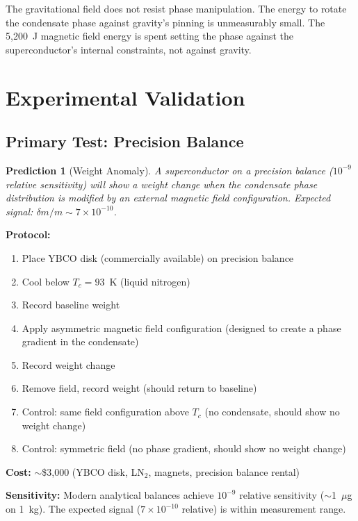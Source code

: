 \documentclass[11pt, a4paper]{article}
\newtheorem{prediction}{Prediction}[section]
\begin{document}
The gravitational field does not resist phase manipulation.
The energy to rotate the condensate phase against gravity's
pinning is unmeasurably small. The 5{,}200~J magnetic field
energy is spent setting the phase against the superconductor's
internal constraints, not against gravity.

\section{Experimental Validation}

\subsection{Primary Test: Precision Balance}

\begin{prediction}[Weight Anomaly]
A superconductor on a precision balance ($10^{-9}$ relative
sensitivity) will show a weight change when the condensate phase
distribution is modified by an external magnetic field
configuration. Expected signal: $\delta m/m \sim 7 \times 10^{-10}$.
\end{prediction}

\textbf{Protocol:}
\begin{enumerate}[nosep]
  \item Place YBCO disk (commercially available) on precision
        balance
  \item Cool below $T_c = 93$~K (liquid nitrogen)
  \item Record baseline weight
  \item Apply asymmetric magnetic field configuration
        (designed to create a phase gradient in the condensate)
  \item Record weight change
  \item Remove field, record weight (should return to baseline)
  \item Control: same field configuration above $T_c$
        (no condensate, should show no weight change)
  \item Control: symmetric field (no phase gradient,
        should show no weight change)
\end{enumerate}

\textbf{Cost:} $\sim$\$3{,}000 (YBCO disk, LN$_2$, magnets,
precision balance rental)

\textbf{Sensitivity:} Modern analytical balances achieve
$10^{-9}$ relative sensitivity ($\sim$1~$\mu$g on 1~kg).
The expected signal ($7 \times 10^{-10}$ relative) is within
measurement range.
\end{document}
